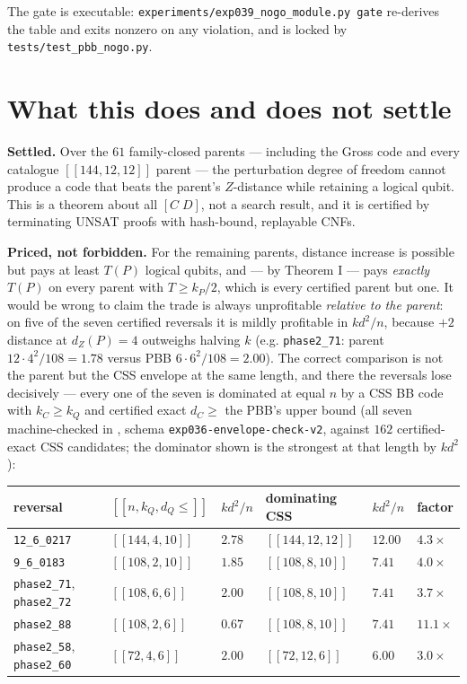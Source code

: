 \documentclass[11pt]{article}
\newcommand{\nk}[1]{[\![#1]\!]}
\theoremstyle{plain}
\theoremstyle{remark}
\begin{document}
The gate is executable: \texttt{experiments/exp039\_nogo\_module.py gate} re-derives the table and
exits nonzero on any violation, and is locked by \texttt{tests/test\_pbb\_nogo.py}.

\section{What this does and does not settle}\label{sec:settle}

\textbf{Settled.} Over the $61$ family-closed parents --- including the Gross code and every
catalogue $\nk{144,12,12}$ parent --- the perturbation degree of freedom cannot produce a
code that beats the parent's $Z$-distance while retaining a logical qubit. This is a
theorem about all $[C\;D]$, not a search result, and it is certified by terminating UNSAT
proofs with hash-bound, replayable CNFs.

\textbf{Priced, not forbidden.} For the remaining parents, distance increase is possible but
pays at least $T(P)$ logical qubits, and --- by Theorem I --- pays \emph{exactly} $T(P)$ on
every parent with $T\ge k_P/2$, which is every certified parent but one. It would be
wrong to claim the trade is always unprofitable \emph{relative to the parent}: on five of the
seven certified reversals it is mildly profitable in $kd^2/n$, because $+2$ distance at
$d_Z(P)=4$ outweighs halving $k$ (e.g. \texttt{phase2\_71}: parent $12\cdot 4^2/108=1.78$ versus
PBB $6\cdot 6^2/108=2.00$). The correct comparison is not the parent but the CSS envelope
at the same length, and there the reversals lose decisively --- every one of the seven is
dominated at equal $n$ by a CSS BB code with $k_C\ge k_Q$ and certified exact
$d_C\ge$ the PBB's upper bound (all seven machine-checked in
, schema
\texttt{exp036-envelope-check-v2}, against $162$ certified-exact CSS candidates; the dominator
shown is the strongest at that length by $kd^2$):

\begin{table}[ht]
\centering
\small
\begin{tabular}{llllll}
\toprule
reversal & $\nk{n,k_Q,d_Q{\le}}$ & $kd^2/n$ & dominating CSS & $kd^2/n$ & factor \\
\midrule
\texttt{12\_6\_0217} & $\nk{144,4,10}$ & $2.78$ & $\nk{144,12,12}$ & $12.00$ & $4.3\times$ \\
\texttt{9\_6\_0183} & $\nk{108,2,10}$ & $1.85$ & $\nk{108,8,10}$ & $7.41$ & $4.0\times$ \\
\texttt{phase2\_71}, \texttt{phase2\_72} & $\nk{108,6,6}$ & $2.00$ & $\nk{108,8,10}$ & $7.41$ & $3.7\times$ \\
\texttt{phase2\_88} & $\nk{108,2,6}$ & $0.67$ & $\nk{108,8,10}$ & $7.41$ & $11.1\times$ \\
\texttt{phase2\_58}, \texttt{phase2\_60} & $\nk{72,4,6}$ & $2.00$ & $\nk{72,12,6}$ & $6.00$ & $3.0\times$ \\
\bottomrule
\end{tabular}
\end{table}
\end{document}
